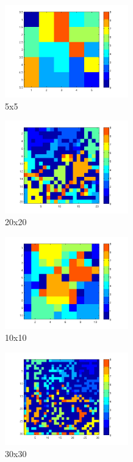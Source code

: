\documentclass[informe.tex]{subfiles}
\begin{document}
       
       \begin{minipage}{0.30\textwidth}
	 \centering
	 \begin{figure}[H]
	  \centering
	    \includegraphics[height=4cm,keepaspectratio]{graficos/calor/calor_5x5.png}
		  \caption{\small 5x5}
	 \end{figure}
	 \begin{figure}[H]
	  \centering
	    \includegraphics[height=4cm,keepaspectratio]{graficos/calor/calor_20x20.png}
		  \caption{\small 20x20}
	 \end{figure}
       \end{minipage}
       \begin{minipage}{0.33\textwidth}
	 \centering
	 \begin{figure}[H]
	  \centering
	    \includegraphics[height=4cm,keepaspectratio]{graficos/calor/calor_10x10.png}
		  \caption{\small 10x10}
	 \end{figure}
	 \begin{figure}[H]
	  \centering
	    \includegraphics[height=4cm,keepaspectratio]{graficos/calor/calor_30x30.png}
		  \caption{\small 30x30}
	 \end{figure}
       \end{minipage}
\end{document}
